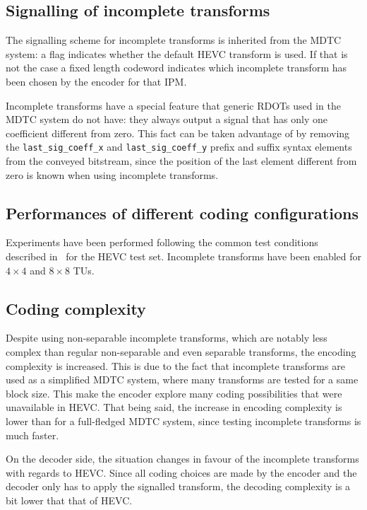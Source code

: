 \documentclass[11pt,a4paper,openright,twoside]{book}
\numberwithin{equation}{section} %
\numberwithin{figure}{section} %
\numberwithin{table}{section} %
\begin{document}
\subsection{Signalling of incomplete transforms}
\label{sub:it_signalling}

The signalling scheme for incomplete transforms is inherited from the
\ac{MDTC} system:
a flag indicates whether the default \ac{HEVC} transform is used.
If that is not the case a fixed length codeword indicates which incomplete
transform has been chosen by the encoder for that \ac{IPM}.

Incomplete transforms have a special feature that generic \acp{RDOT} used in
the \ac{MDTC} system do not have:
they always output a signal that has only one coefficient different from zero.
This fact can be taken advantage of by removing the
\texttt{last\_sig\_coeff\_x} and \texttt{last\_sig\_coeff\_y} prefix and
suffix syntax elements from the conveyed bitstream, since the position of the
last element different from zero is known when using incomplete transforms.

\subsection{Performances of different coding configurations}
\label{sub:it_performances}

Experiments have been performed following the common test conditions described
in~\cite{bossen-12-common-test-conditions} for the \ac{HEVC} test set.
Incomplete transforms have been enabled for $4\times4$ and $8\times8$
\acp{TU}.

\subsection{Coding complexity}
\label{sub:it_coding_complexity}

Despite using non-separable incomplete transforms, which are notably less
complex than regular non-separable and even separable transforms, the encoding
complexity is increased.
This is due to the fact that incomplete transforms are used as a simplified
\ac{MDTC} system, where many transforms are tested for a same block size.
This make the encoder explore many coding possibilities that were unavailable
in \ac{HEVC}.
That being said, the increase in encoding complexity is lower than for a
full-fledged \ac{MDTC} system, since testing incomplete transforms is much
faster.

On the decoder side, the situation changes in favour of the incomplete
transforms with regards to \ac{HEVC}.
Since all coding choices are made by the encoder and the decoder only has to
apply the signalled transform, the decoding complexity is a bit lower that
that of \ac{HEVC}.
\end{document}
